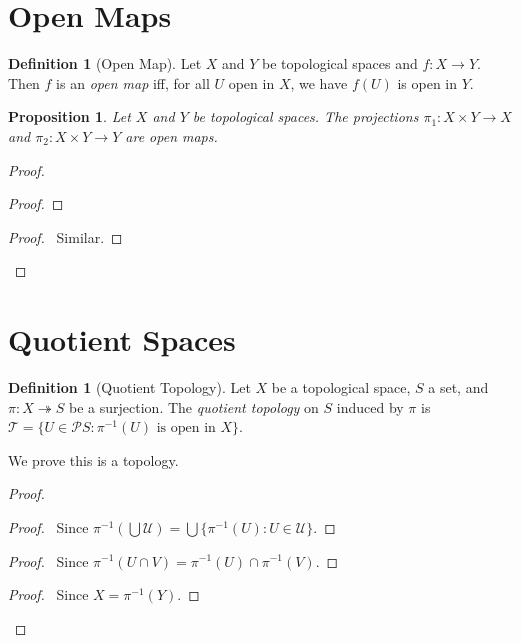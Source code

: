 \documentclass{book}
\let\qed\relax
\newtheorem{prop}[ax]{Proposition}
\theoremstyle{definition}
\newtheorem{df}[ax]{Definition}
\newcommand{\inv}[1]{\ensuremath{{#1}^{-1}}}
\begin{document}
\section{Open Maps}

\begin{df}[Open Map]
Let $X$ and $Y$ be topological spaces and $f : X \rightarrow Y$. Then $f$ is an \emph{open map} iff, for all $U$ open in $X$, we have $f(U)$ is open in $Y$.
\end{df}

\begin{prop}
Let $X$ and $Y$ be topological spaces. The projections $\pi_1 : X \times Y \rightarrow X$ and $\pi_2 : X \times Y \rightarrow Y$ are open maps.
\end{prop}

\begin{proof}
\pf
{}
\begin{proof}
\end{proof}
\begin{proof}
	\pf\ Similar.
\end{proof}
\qed
\end{proof}

\section{Quotient Spaces}

\begin{df}[Quotient Topology]
Let $X$ be a topological space, $S$ a set, and $\pi : X \twoheadrightarrow S$ be a surjection. The \emph{quotient topology} on $S$ induced by $\pi$ is $\mathcal{T} = \{ U \in \mathcal{P} S : \inv{\pi}(U) \text{ is open in } X \}$.

We prove this is a topology.
\end{df}

\begin{proof}
\pf
{}
\begin{proof}
	\pf\ Since $\inv{\pi}(\bigcup \mathcal{U}) = \bigcup \{ \inv{\pi}(U) : U \in \mathcal{U} \}$.
\end{proof}
\begin{proof}
	\pf\ Since $\inv{\pi}(U \cap V) = \inv{\pi}(U) \cap \inv{\pi}(V)$.
\end{proof}
\begin{proof}
	\pf\ Since $X = \inv{\pi}(Y)$.
\end{proof}
\qed
\end{proof}
\end{document}
